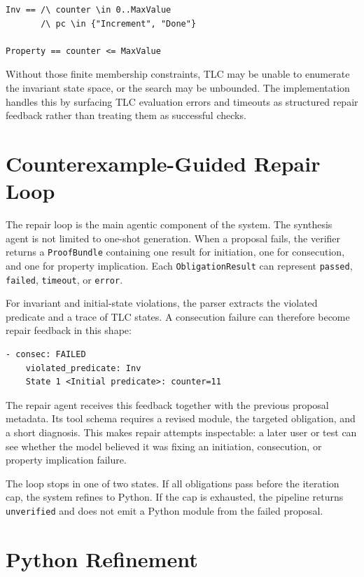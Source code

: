 \documentclass[11pt]{article}
\begin{document}
\begin{lstlisting}
Inv == /\ counter \in 0..MaxValue
       /\ pc \in {"Increment", "Done"}

Property == counter <= MaxValue
\end{lstlisting}

Without those finite membership constraints, TLC may be unable to enumerate
the invariant state space, or the search may be unbounded. The implementation
handles this by surfacing TLC evaluation errors and timeouts as structured
repair feedback rather than treating them as successful checks.

\section{Counterexample-Guided Repair Loop}

The repair loop is the main agentic component of the system. The synthesis
agent is not limited to one-shot generation. When a proposal fails, the
verifier returns a \texttt{ProofBundle} containing one result for initiation,
one for consecution, and one for property implication. Each
\texttt{ObligationResult} can represent \texttt{passed}, \texttt{failed},
\texttt{timeout}, or \texttt{error}.

For invariant and initial-state violations, the parser extracts the violated
predicate and a trace of TLC states. A consecution failure can therefore become
repair feedback in this shape:

\begin{lstlisting}
- consec: FAILED
    violated_predicate: Inv
    State 1 <Initial predicate>: counter=11
\end{lstlisting}

The repair agent receives this feedback together with the previous proposal
metadata. Its tool schema requires a revised module, the targeted obligation,
and a short diagnosis. This makes repair attempts inspectable: a later user or
test can see whether the model believed it was fixing an initiation,
consecution, or property implication failure.

The loop stops in one of two states. If all obligations pass before the
iteration cap, the system refines to Python. If the cap is exhausted, the
pipeline returns \texttt{unverified} and does not emit a Python module from the
failed proposal.

\section{Python Refinement}
\end{document}
